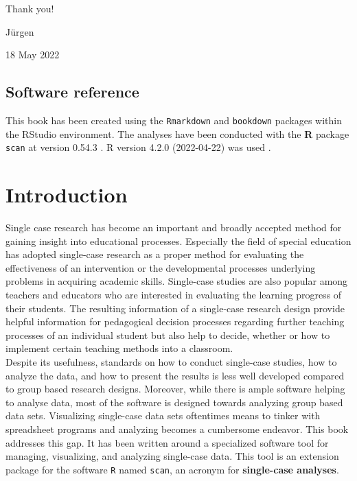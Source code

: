 \documentclass[
]{book}
\begin{document}
Thank you!

Jürgen

18 May 2022

\hypertarget{software-reference}{%
\section*{Software reference}\label{software-reference}}

This book has been created using the \texttt{Rmarkdown} \citep{R-rmarkdown} and \texttt{bookdown} \citep{R-bookdown} packages within the RStudio \citep{RStudio} environment. The analyses have been conducted with the \textbf{R} package \texttt{scan} at version 0.54.3 \citep{R-scan}. R version 4.2.0 (2022-04-22) was used \citep{R-base}.

\hypertarget{introduction}{%
\chapter{Introduction}\label{introduction}}

Single case research has become an important and broadly accepted method for gaining insight into educational processes. Especially the field of special education has adopted single-case research as a proper method for evaluating the effectiveness of an intervention or the developmental processes underlying problems in acquiring academic skills. Single-case studies are also popular among teachers and educators who are interested in evaluating the learning progress of their students. The resulting information of a single-case research design provide helpful information for pedagogical decision processes regarding further teaching processes of an individual student but also help to decide, whether or how to implement certain teaching methods into a classroom.\\
Despite its usefulness, standards on how to conduct single-case studies, how to analyze the data, and how to present the results is less well developed compared to group based research designs. Moreover, while there is ample software helping to analyse data, most of the software is designed towards analyzing group based data sets. Visualizing single-case data sets oftentimes means to tinker with spreadsheet programs and analyzing becomes a cumbersome endeavor. This book addresses this gap. It has been written around a specialized software tool for managing, visualizing, and analyzing single-case data. This tool is an extension package for the software \texttt{R} \citep{R-base} named \texttt{scan}, an acronym for \textbf{single-case analyses}.
\end{document}
